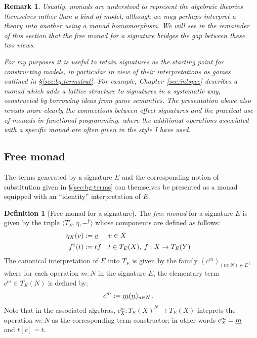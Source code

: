 \documentclass[11pt,oneside,draft]{book}
\newtheorem{remark}[theorem]{Remark}
\theoremstyle{definition}
\newtheorem{definition}[theorem]{Definition}
\newcommand{\ul}[1]{%
  \underline{\smash{#1}}
}
\begin{document}
\begin{remark}
Usually, monads are understood to
represent the algebraic theories themselves
rather than a kind of model,
although we may perhaps interpret a theory
into another using a \emph{monad homomorphism}.
We will see in the remainder of this section that
the \emph{free monad} for a signature
bridges the gap between these two views.

For my purposes it is useful to retain signatures
as the starting point for constructing models,
in particular in view of their interpretations as games
outlined in \S\ref{sec:bg:termstrat}.
For example,
Chapter~\ref{sec:intspec}
describes a monad which adds
a lattice structure to signatures in a systematic way,
constructed by borrowing ideas from game semantics.
The presentation above also
reveals more clearly the connections between effect signatures
and the practical use of monads in functional programming,
where the additional operations associated with a specific monad
are often given in the style I have used.
\end{remark}


\subsection{Free monad} %

The terms generated by a signature $E$
and the corresponding notion of substitution
given in \S\ref{sec:bg:terms}
can themselves be presented as a monad
equipped with an ``identity'' interpretation of $E$.

\begin{definition}[Free monad for a signature]
The \emph{free monad} for a signature $E$
is given by the triple $\langle T_E, \eta, {-}^\dagger \rangle$
whose components are defined as follows:
\begin{align*}
  \eta_X(v) &:= \ul{v} && v \in X
  \\
  f^\dagger(t) &:= t f &&
    t \in T_E(X), \:
    f : X \rightarrow T_E(Y)
\end{align*}
The canonical interpretation of $E$ into $T_E$
is given by the family $(c^m)_{(m \mathop: N) \in E}$,
where for each operation $m \mathop: N$
in the signature $E$,
the elementary term $c^m \in T_E(N)$
is defined by:
\[
  c^m := \ul{m}(\ul{n})_{n \in N}
  \,.
\]
Note that in the associated algebras,
$c^m_X : T_E(X)^N \rightarrow T_E(X)$
inteprets the operation $m \mathop: N$
as the corresponding term constructor;
in other words $c^m_X = \ul{m}$ and $t[c] = t$.
\end{definition}
\end{document}
